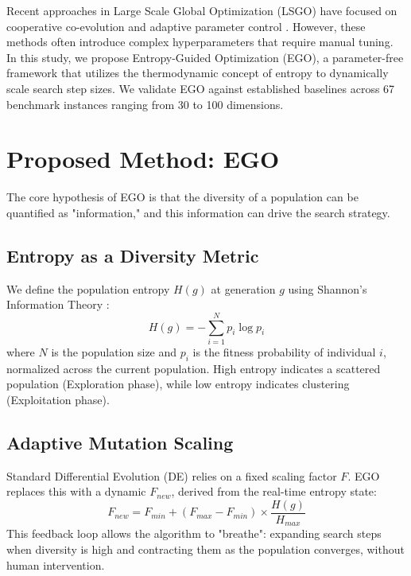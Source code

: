 \documentclass[conference]{IEEEtran}
\begin{document}
Recent approaches in Large Scale Global Optimization (LSGO) have focused on cooperative co-evolution \cite{b4} and adaptive parameter control \cite{b5}. However, these methods often introduce complex hyperparameters that require manual tuning. In this study, we propose Entropy-Guided Optimization (EGO), a parameter-free framework that utilizes the thermodynamic concept of entropy to dynamically scale search step sizes. We validate EGO against established baselines across 67 benchmark instances ranging from 30 to 100 dimensions.

\section{Proposed Method: EGO}
The core hypothesis of EGO is that the diversity of a population can be quantified as "information," and this information can drive the search strategy.

\subsection{Entropy as a Diversity Metric}
We define the population entropy $H(g)$ at generation $g$ using Shannon's Information Theory \cite{b6}:
\begin{equation}
H(g) = - \sum_{i=1}^{N} p_i \log p_i
\end{equation}
where $N$ is the population size and $p_i$ is the fitness probability of individual $i$, normalized across the current population. High entropy indicates a scattered population (Exploration phase), while low entropy indicates clustering (Exploitation phase).

\subsection{Adaptive Mutation Scaling}
Standard Differential Evolution (DE) \cite{b7} relies on a fixed scaling factor $F$. EGO replaces this with a dynamic $F_{new}$, derived from the real-time entropy state:
\begin{equation}
F_{new} = F_{min} + (F_{max} - F_{min}) \times \frac{H(g)}{H_{max}}
\end{equation}
This feedback loop allows the algorithm to "breathe": expanding search steps when diversity is high and contracting them as the population converges, without human intervention.
\end{document}
